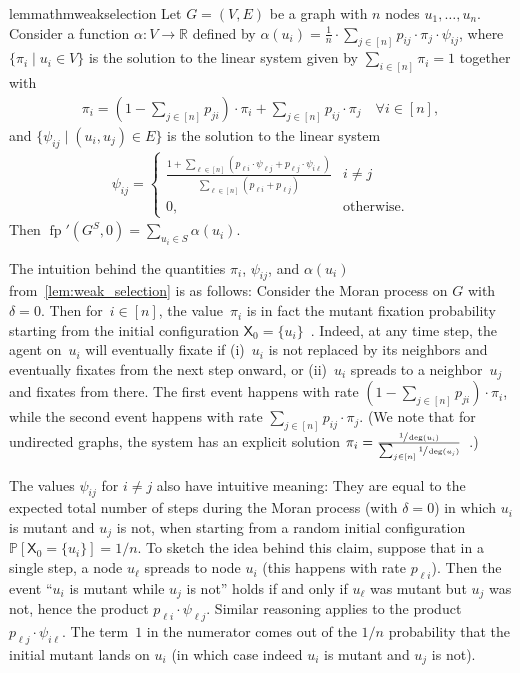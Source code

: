 \documentclass[letterpaper]{article}
\def\Pr{\mathbb{P}}
\def\R{\mathbb{R}}
\newcommand{\X}{\mathsf{X}}
\newcommand{\fp}{\operatorname{fp}}
\newcommand{\FitAdv}{\delta}
\begin{document}
\begin{restatable}{lemma}{thmweakselection}\label{lem:weak_selection}
Let $G=(V,E)$ be a graph with $n$ nodes $u_1,\dots,u_n$. %
 Consider a function $\alpha\colon V\to\R$ defined by $\alpha(u_i) =  \frac{1}{n}\cdot \sum_{j\in[n]} p_{ij} \cdot \pi_j\cdot \psi_{ij}$,
where $\{\pi_i\mid u_i\in V\}$ is the solution to the linear system
given by $\sum_{i\in [n]} \pi_i=1$ together with
\begin{align}
\pi_i= \left(1-\sum_{j\in[n]} p_{ji}\right)\cdot \pi_i +\sum_{j\in[n]} p_{ij}\cdot \pi_j\quad\forall i\in[n],
\label{eq:pi2}
\end{align}
and $\{\psi_{ij} \mid (u_i,u_j)\in E\}$ is the solution to the linear system
\begin{align}
\psi_{ij}=
\begin{cases}
\frac{1+\sum_{\ell\in[n]}\left(p_{\ell i}\cdot \psi_{\ell j} + p_{\ell j}\cdot \psi_{i\ell}\right)}{\sum_{\ell\in[n]}\left(p_{\ell i}+p_{\ell j}\right)} & i\neq j %
\\
0, & \text{otherwise}.
\end{cases}
\label{eq:psi}
\end{align}
Then $\fp'(G^S,0)=\sum_{u_i\in S} \alpha(u_i)$.
\end{restatable}

The intuition behind the quantities $\pi_i$, $\psi_{ij}$, and $\alpha(u_i)$ from~\cref{lem:weak_selection} is as follows:
Consider the Moran process on $G$ with $\FitAdv=0$.
Then for~$i\in[n]$, the value~$\pi_i$ is in fact the mutant fixation probability
starting from the initial configuration $\X_0=\{u_i\}$~\cite{Allen2021}.
Indeed, at any time step, the agent on~$u_i$ will eventually fixate if
(i)~$u_i$ is not replaced by its neighbors and eventually fixates from the next step onward, or
(ii)~$u_i$ spreads to a neighbor~$u_j$ and fixates from there.
The first event happens with rate $(1-\sum_{j\in[n]}p_{ji})\cdot\pi_i $,
while the second event happens with rate $\sum_{j\in[n]} p_{ij}\cdot \pi_j$.
(We note that for undirected graphs, the system has an explicit solution
$\pi_i = \frac{\sfrac{1}{\deg(u_i)}}{\sum_{j\in[n]}\sfrac{1}{\deg(u_j)}}$~\cite{Broom2010}.)

The values $\psi_{ij}$ for
$i\ne j$
also have intuitive meaning:
They are equal to the expected total number of steps during the Moran process (with $\FitAdv=0$)
in which $u_i$ is mutant and $u_j$ is not,
when starting from a random initial configuration $\Pr[\X_0=\{u_i\}]=1/n$.
To sketch the idea behind this claim,
suppose that in a single step, a node $u_\ell$ spreads to node $u_i$
(this happens with rate $p_{\ell i}$).
Then the event ``$u_i$ is mutant while $u_j$ is not'' holds
if and only if $u_\ell$ was mutant but $u_j$ was not, hence the product $p_{\ell i}\cdot \psi_{\ell j}$.
Similar reasoning applies to the product $p_{\ell j}\cdot \psi_{i\ell}$.
The term~$1$ in the numerator comes out of the $1/n$ probability that the initial mutant lands on $u_i$ (in which case indeed $u_i$ is mutant and $u_j$ is not).
\end{document}
